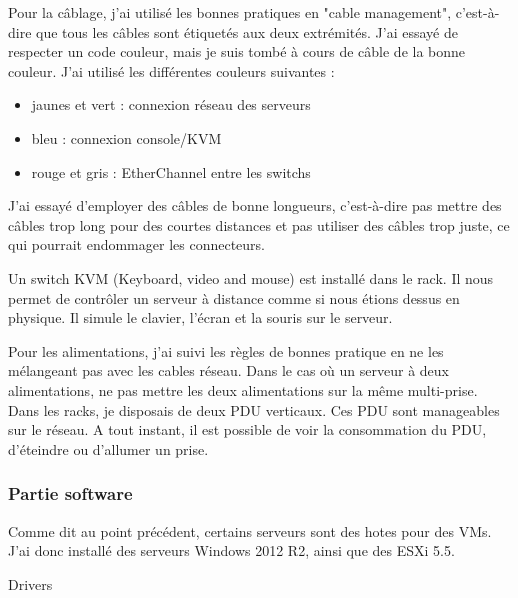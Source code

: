 Pour la câblage, j'ai utilisé les bonnes pratiques en "cable management", c'est-à-dire que tous les câbles sont étiquetés aux deux extrémités.
J'ai essayé de respecter un code couleur, mais je suis tombé à cours de câble de la bonne couleur.
J'ai utilisé les différentes couleurs suivantes :
\begin{itemize}
	\item jaunes et vert : connexion réseau des serveurs
	\item bleu : connexion console/KVM
	\item rouge et gris : EtherChannel entre les switchs
\end{itemize}
J'ai essayé d'employer des câbles de bonne longueurs, c'est-à-dire pas mettre des câbles trop long pour des courtes distances et pas utiliser des câbles trop juste, ce qui pourrait endommager les connecteurs.

Un switch KVM (Keyboard, video and mouse) est installé dans le rack.
Il nous permet de contrôler un serveur à distance comme si nous étions dessus en physique.
Il simule le clavier, l'écran et la souris sur le serveur. 

Pour les alimentations, j'ai suivi les règles de bonnes pratique en ne les mélangeant pas avec les cables réseau.
Dans le cas où un serveur à deux alimentations, ne pas mettre les deux alimentations sur la même multi-prise.
Dans les racks, je disposais de deux PDU verticaux. 
Ces PDU sont manageables sur le réseau. 
A tout instant, il est possible de voir la consommation du PDU, d'éteindre ou d'allumer un prise.

\subsubsection{Partie software}
Comme dit au point précédent, certains serveurs sont des hotes pour des VMs.
J'ai donc installé des serveurs Windows 2012 R2, ainsi que des ESXi 5.5.

Drivers

